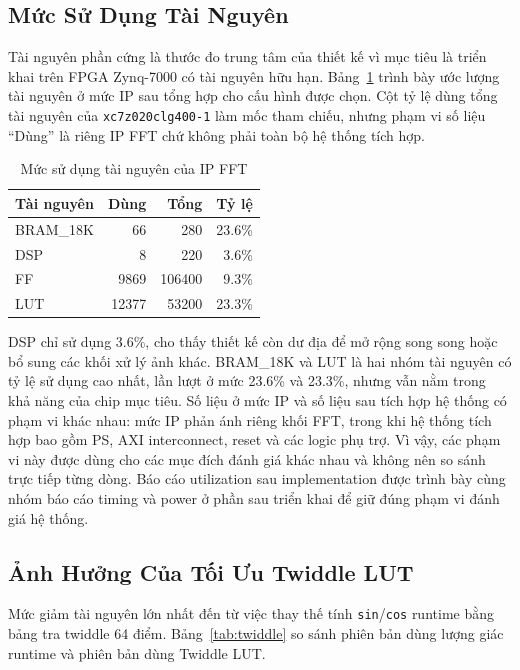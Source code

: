 ﻿\documentclass[conference]{IEEEtran}
\begin{document}
\subsection{Mức Sử Dụng Tài Nguyên}
Tài nguyên phần cứng là thước đo trung tâm của thiết kế vì mục tiêu là triển khai trên FPGA Zynq-7000 có tài nguyên hữu hạn. Bảng~\ref{tab:resource} trình bày ước lượng tài nguyên ở mức IP sau tổng hợp cho cấu hình được chọn. Cột tỷ lệ dùng tổng tài nguyên của \texttt{xc7z020clg400-1} làm mốc tham chiếu, nhưng phạm vi số liệu ``Dùng'' là riêng IP FFT chứ không phải toàn bộ hệ thống tích hợp.

\begin{table}[htbp]
    \caption{Mức sử dụng tài nguyên của IP FFT}
    \centering
    \label{tab:resource}
    \begin{tabular}{lrrr}
        \toprule
        \textbf{Tài nguyên} & \textbf{Dùng} & \textbf{Tổng} & \textbf{Tỷ lệ} \\
        \midrule
        BRAM\_18K           & 66            & 280           & 23.6\%         \\
        DSP                 & 8             & 220           & 3.6\%          \\
        FF                  & 9869          & 106400        & 9.3\%          \\
        LUT                 & 12377         & 53200         & 23.3\%         \\
        \bottomrule
    \end{tabular}
\end{table}

DSP chỉ sử dụng 3.6\%, cho thấy thiết kế còn dư địa để mở rộng song song hoặc bổ sung các khối xử lý ảnh khác. BRAM\_18K và LUT là hai nhóm tài nguyên có tỷ lệ sử dụng cao nhất, lần lượt ở mức 23.6\% và 23.3\%, nhưng vẫn nằm trong khả năng của chip mục tiêu. Số liệu ở mức IP và số liệu sau tích hợp hệ thống có phạm vi khác nhau: mức IP phản ánh riêng khối FFT, trong khi hệ thống tích hợp bao gồm PS, AXI interconnect, reset và các logic phụ trợ. Vì vậy, các phạm vi này được dùng cho các mục đích đánh giá khác nhau và không nên so sánh trực tiếp từng dòng. Báo cáo utilization sau implementation được trình bày cùng nhóm báo cáo timing và power ở phần sau triển khai để giữ đúng phạm vi đánh giá hệ thống.

\subsection{Ảnh Hưởng Của Tối Ưu Twiddle LUT}
Mức giảm tài nguyên lớn nhất đến từ việc thay thế tính \texttt{sin}/\texttt{cos} runtime bằng bảng tra twiddle 64 điểm. Bảng~\ref{tab:twiddle} so sánh phiên bản dùng lượng giác runtime và phiên bản dùng Twiddle LUT.
\end{document}

